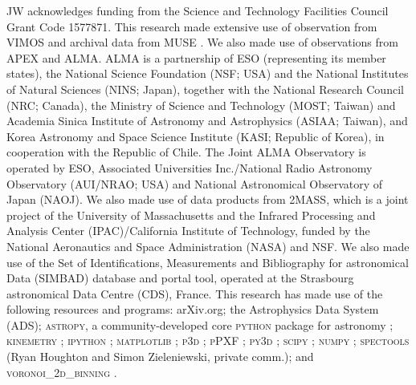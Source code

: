 \documentclass[a4paper,fleqn,usenatbib]{mnras}
\DeclareRobustCommand{\removed}[1]{{\sethlcolor{red}\hl{#1}}}
\DeclareRobustCommand{\added}[1]{{\sethlcolor{green}\hl{#1}}}
\begin{document}
JW acknowledges funding from the Science and Technology Facilities
Council Grant Code 1577871. This research made extensive use of
observation from VIMOS \citep{LeFevre2003} and archival data from MUSE
\citep{Bacon2010}. We also made use of observations from APEX
\citep{Gusten2006} and ALMA. ALMA is a partnership of ESO
(representing its member states), the National Science Foundation
(NSF; USA) and the National Institutes of Natural Sciences (NINS;
Japan), together with the National Research Council (NRC; Canada), the
Ministry of Science and Technology (MOST; Taiwan) and Academia Sinica
Institute of Astronomy and Astrophysics (ASIAA; Taiwan), and Korea
Astronomy and Space Science Institute (KASI; Republic of Korea), in
cooperation with the Republic of Chile. The Joint ALMA Observatory is
operated by ESO, Associated Universities Inc./National Radio Astronomy
Observatory (AUI/NRAO; USA) and National Astronomical Observatory of
Japan (NAOJ). We also made use of data products from 2MASS, which is a
joint project of the University of Massachusetts and the Infrared
Processing and Analysis Center (IPAC)/California Institute of
Technology, funded by the National Aeronautics and Space
Administration (NASA) and NSF. We also made use of the Set of
Identifications, Measurements and Bibliography for astronomical Data
(SIMBAD) database and portal tool, operated at the Strasbourg
astronomical Data Centre (CDS), France. This research has made use of
the following resources and programs: arXiv.org; the Astrophysics Data
System (ADS); \textsc{astropy}, a community-developed core
\textsc{python} package for astronomy
\citep{TheAstropyCollaboration2013}; \textsc{kinemetry}
\citep{Krajnovic2006}; \textsc{ipython} \citep{Perez2007};
\textsc{matplotlib} \citep{Hunter2007}; \textsc{p3d}
\citep{Sandin2010, Sandin2011}; \textsc{pPXF} \citep{Cappellari2004};
\textsc{py3d} \citep{Sanchez2011, Husemann2013, Husemann2014};
\textsc{scipy} \citep{Oliphant2007, Millman2011}; \textsc{numpy}
\citep{VanderWalt2011}; \textsc{spectools} (Ryan Houghton and Simon
Zieleniewski, private comm.); and \textsc{voronoi\_2d\_binning}
\citep[including the SAURON \added{Colourmaps}\removed{colourmaps} 
{\bf (Colourmaps, whatever that might be, or colour table? Clarify.)}; ][]{Cappellari2003}.




\end{document}
